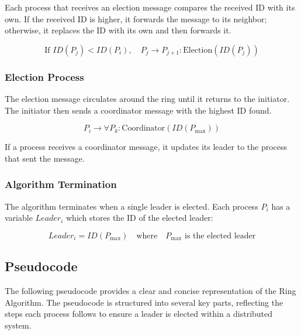 Each process that receives an election message compares the received ID with its own. If the received ID is higher, it forwards the message to its neighbor; otherwise, it replaces the ID with its own and then forwards it.

\begin{equation}
\text{If } ID(P_j) < ID(P_i), \quad P_j \rightarrow P_{j+1}: \text{Election}(ID(P_j))
\end{equation}

\subsubsection{Election Process}

The election message circulates around the ring until it returns to the initiator. The initiator then sends a coordinator message with the highest ID found.

\begin{equation}
P_i \rightarrow \forall P_k: \text{Coordinator}(ID(P_{\text{max}}))
\end{equation}

If a process receives a coordinator message, it updates its leader to the process that sent the message.

\subsubsection{Algorithm Termination}

The algorithm terminates when a single leader is elected. Each process \(P_i\) has a variable \(Leader_i\) which stores the ID of the elected leader:

\begin{equation}
Leader_i = ID(P_{\text{max}}) \quad \text{where} \quad P_{\text{max}} \text{ is the elected leader}
\end{equation}

\subsection{Pseudocode}

The following pseudocode provides a clear and concise representation of the Ring Algorithm. The pseudocode is structured into several key parts, reflecting the steps each process follows to ensure a leader is elected within a distributed system.

